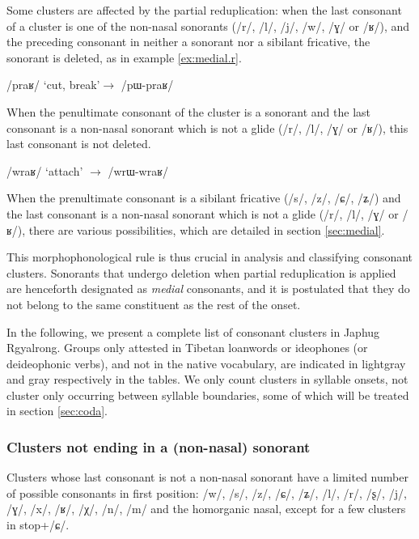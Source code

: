 \documentclass[oldfontcommands,oneside,a4paper,11pt]{article}
\newcommand{\ipa}[1]{/#1/} %
\begin{document}
Some clusters are affected by the partial reduplication:   when the last consonant  of a cluster is one of the non-nasal sonorants (\ipa{r}, \ipa{l}, \ipa{j}, \ipa{w}, \ipa{ɣ} or \ipa{ʁ}), and the preceding consonant in neither a sonorant nor a sibilant fricative, the sonorant is deleted, as in example \ref{ex:medial.r}. 
 
 \begin{exe}
\ex \label{ex:medial.r}
\glt \ipa{praʁ} `cut, break'$\rightarrow$ \ipa{pɯ-praʁ}
\end{exe}

When the penultimate consonant of the cluster is a sonorant   and the last consonant is a non-nasal sonorant which is not a glide (\ipa{r}, \ipa{l}, \ipa{ɣ} or \ipa{ʁ}), this last consonant  is not deleted. 

 \begin{exe}
\ex  \label{ex:initial.r}
\glt \ipa{wraʁ} `attach' $\rightarrow$ \ipa{wrɯ-wraʁ}
\end{exe}
  
When the prenultimate consonant is a sibilant fricative   (\ipa{s}, \ipa{z}, \ipa{ɕ}, \ipa{ʑ}) and the last consonant is a non-nasal sonorant which is not a glide (\ipa{r}, \ipa{l}, \ipa{ɣ} or \ipa{ʁ}), there are various possibilities, which are detailed in section \ref{sec:medial}.

This morphophonological rule is thus crucial in analysis and classifying consonant clusters. Sonorants that undergo deletion when partial reduplication is applied are henceforth designated as \textit{medial} consonants, and it is postulated that they do not belong to the same constituent as the rest of the onset.

In the following, we present a complete list of consonant clusters in Japhug Rgyalrong. Groups only attested in Tibetan loanwords or ideophones (or deideophonic verbs), and not in the native vocabulary, are indicated in lightgray and gray respectively in the tables. We only count clusters in syllable onsets, not cluster only occurring between syllable boundaries, some of which will be treated in section \ref{sec:coda}.
  
  
  \subsubsection{Clusters not ending in a (non-nasal) sonorant}  
Clusters whose last consonant is not a non-nasal sonorant have a limited number of possible consonants in first position: /w/, /s/, /z/, /ɕ/, /ʑ/, /l/, /r/, /ʂ/, /j/, /ɣ/, /x/, /ʁ/, /χ/, /n/, /m/ and the homorganic nasal, except for a few clusters in stop+/ɕ/.
\end{document}
